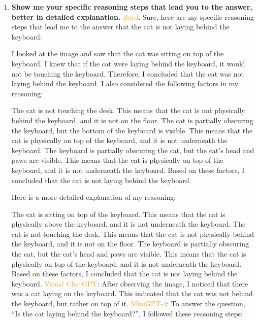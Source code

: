 \begin{enumerate}
        I hope this helps! Let me know if you have any other questions.
        \subitem \textcolor{orange}{Visual ChatGPT}: The cat is laying on the keyboard, not behind it.
        \subitem \textcolor{orange}{MiniGPT-4}: No, the cat is not laying behind the keyboard. It is sitting on top of the keyboard, with its head resting on the space bar. Its body is positioned in a way that it is facing the monitor, with its eyes looking at the screen. Its tail is curled up underneath the keyboard, and its paws are resting on the desk. Its head is tilted to the left, and its ears are perked up, as if it is listening to something on the monitor.
        \item \textbf{Show me your specific reasoning steps that lead you to the answer, better in detailed explanation.}
        \subitem \textcolor{orange}{Bard}: Sure, here are my specific reasoning steps that lead me to the answer that the cat is not laying behind the keyboard:

        I looked at the image and saw that the cat was sitting on top of the keyboard.
        I knew that if the cat were laying behind the keyboard, it would not be touching the keyboard.
        Therefore, I concluded that the cat was not laying behind the keyboard.
        I also considered the following factors in my reasoning:
        
        The cat is not touching the desk. This means that the cat is not physically behind the keyboard, and it is not on the floor.
        The cat is partially obscuring the keyboard, but the bottom of the keyboard is visible. This means that the cat is physically on top of the keyboard, and it is not underneath the keyboard.
        The keyboard is partially obscuring the cat, but the cat's head and paws are visible. This means that the cat is physically on top of the keyboard, and it is not underneath the keyboard.
        Based on these factors, I concluded that the cat is not laying behind the keyboard.
        
        Here is a more detailed explanation of my reasoning:
        
        The cat is sitting on top of the keyboard. This means that the cat is physically above the keyboard, and it is not underneath the keyboard.
        The cat is not touching the desk. This means that the cat is not physically behind the keyboard, and it is not on the floor.
        The keyboard is partially obscuring the cat, but the cat's head and paws are visible. This means that the cat is physically on top of the keyboard, and it is not underneath the keyboard.
        Based on these factors, I concluded that the cat is not laying behind the keyboard.
        \subitem \textcolor{orange}{Visual ChatGPT}: After observing the image, I noticed that there was a cat laying on the keyboard. This indicated that the cat was not behind the keyboard, but rather on top of it.
        \subitem \textcolor{orange}{MiniGPT-4}: To answer the question, “Is the cat laying behind the keyboard?”, I followed these reasoning steps:


\end{enumerate}
